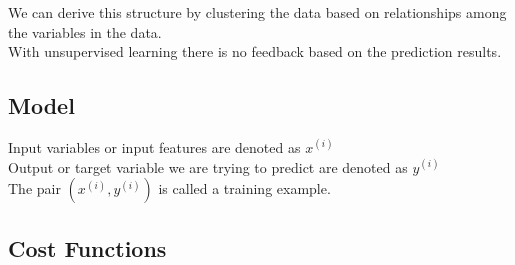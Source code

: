 We can derive this structure by clustering the data based on relationships among the variables in the data.\\

With unsupervised learning there is no feedback based on the prediction results. \\

\subsection{Model}

Input variables or input features are denoted as $x^{(i)}$\\
Output or target variable we are trying to predict are denoted as $y^{(i)}$\\
The pair $(x^{(i)}, y^{(i)})$ is called a training example.


\subsection{Cost Functions}
